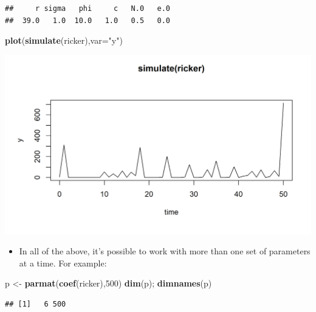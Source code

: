 \documentclass[]{article}
\newenvironment{Shaded}{\begin{snugshade}}{\end{snugshade}}
\newcommand{\KeywordTok}[1]{\textcolor[rgb]{0.13,0.29,0.53}{\textbf{#1}}}
\newcommand{\DataTypeTok}[1]{\textcolor[rgb]{0.13,0.29,0.53}{#1}}
\newcommand{\DecValTok}[1]{\textcolor[rgb]{0.00,0.00,0.81}{#1}}
\newcommand{\StringTok}[1]{\textcolor[rgb]{0.31,0.60,0.02}{#1}}
\newcommand{\NormalTok}[1]{#1}
\providecommand{\tightlist}{%
  \setlength{\itemsep}{0pt}\setlength{\parskip}{0pt}}
\begin{document}
\begin{verbatim}
##     r sigma   phi     c   N.0   e.0 
##  39.0   1.0  10.0   1.0   0.5   0.0
\end{verbatim}


\begin{Shaded}
\begin{Highlighting}[]
\KeywordTok{plot}\NormalTok{(}\KeywordTok{simulate}\NormalTok{(ricker),}\DataTypeTok{var=}\StringTok{"y"}\NormalTok{)}
\end{Highlighting}
\end{Shaded}

\begin{center}\includegraphics{figure/intro-unnamed-chunk-6-1} \end{center}

\begin{itemize}
\tightlist
\item
  In all of the above, it's possible to work with more than one set of
  parameters at a time. For example:
\end{itemize}

\begin{Shaded}
\begin{Highlighting}[]
\NormalTok{p <-}\StringTok{ }\KeywordTok{parmat}\NormalTok{(}\KeywordTok{coef}\NormalTok{(ricker),}\DecValTok{500}\NormalTok{)}
\KeywordTok{dim}\NormalTok{(p); }\KeywordTok{dimnames}\NormalTok{(p)}
\end{Highlighting}
\end{Shaded}

\begin{verbatim}
## [1]   6 500
\end{verbatim}
\end{document}
